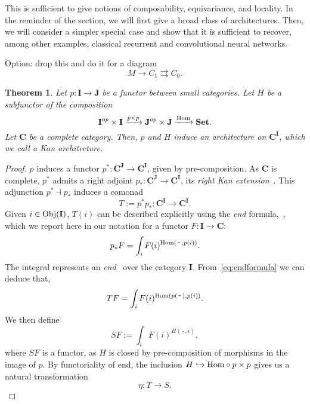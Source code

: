 \documentclass[12pt]{article}
\newtheorem{theorem}{Theorem}
\newcommand{\Hom}{{\textnormal{Hom}}}
\newcommand{\Obj}{{\textnormal{Obj}}}
\newcommand{\Set}{{\mathbf{Set}}}
\newcommand{\Cat}{{\mathbf{C}}}
\newcommand{\ICat}{{\mathbf{I}}}
\newcommand{\JCat}{{\mathbf{J}}}
\newcommand{\anon}{{\,\mbox{-}\,}}
\begin{document}
This is sufficient to give notions of composability, equivariance, and locality. In the reminder of the section, we will first give a broad class of architectures. Then, we will consider a simpler special case and show that it is sufficient to recover, among other examples, classical recurrent and convolutional neural networks.

Option: drop this and do it for a diagram
\begin{equation*}
    M \rightarrow C_1 \rightrightarrows C_0.
\end{equation*}

\begin{theorem}\label{thm:kan_architecture}
    Let $p\colon \ICat \rightarrow \JCat$ be a functor between small categories. Let $H$ be a subfunctor of the composition
    \begin{equation*}
        \ICat^{op} \times \ICat \xrightarrow{p \times p}
        \JCat^{op} \times \JCat \xrightarrow{\Hom} \Set.
    \end{equation*}
    Let $\Cat$ be a complete category. Then, $p$ and $H$ induce an architecture on $\Cat^\ICat$, which we call a {\em Kan architecture}.
\end{theorem}

\begin{proof}
    $p$ induces a functor $p^* \colon \Cat^\JCat \rightarrow \Cat^\ICat$, given by pre-composition. As $\Cat$ is complete, $p^*$ admits a right adjoint $p_* \colon \Cat^\JCat \rightarrow \Cat^\ICat$, its {\em right Kan extension}~\cite[Chapt.~X]{mac2013categories}. This adjunction $p^* \dashv p_*$ induces a comonad
    \begin{equation*}
        T := p^*p_* \colon \Cat^\ICat \rightarrow \Cat^\ICat.
    \end{equation*}
    Given $i \in \Obj(\ICat)$, $T(i)$ can be described explicitly using the {\em end} formula,~\cite[Eq.~X.4.3]{mac2013categories}, which we report here in our notation for a functor $F \colon \ICat \rightarrow \Cat$:
    \begin{equation}\label{eq:endformula}
        p_* F = \int_i F(i)^{\Hom(\anon, p(i))}.
    \end{equation}
    The integral represents an {\em end}~\cite[Sect.~IX.5]{mac2013categories} over the category $\ICat$. From~\cref{eq:endformula} we can deduce that,
    \begin{equation}\label{eq:comonad_endformula}
        T F = \int_i F(i)^{\Hom(p(\anon), p(i))}.
    \end{equation}
    We then define
    \begin{equation}\label{eq:functor_endformula}
        S F := \int_i F(i)^{H(\anon, i)},
    \end{equation}
    where $S F$ is a functor, as $H$ is closed by pre-composition of morphisms in the image of $p$. By functoriality of end, the inclusion $H \hookrightarrow \Hom \circ p \times p$ gives us a natural transformation
    \begin{equation*}
        \eta \colon T \rightarrow S.
    \end{equation*}
\end{proof}
\end{document}
